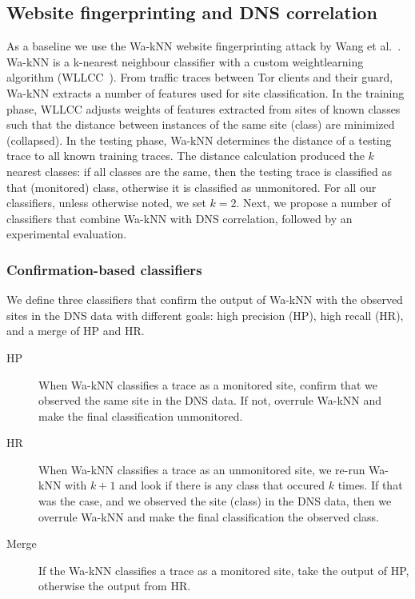 \subsection{Website fingerprinting and DNS correlation}
As a baseline we use the Wa-kNN website fingerprinting attack by
Wang et al.~\cite{Wang2014a}. Wa-kNN is a k-nearest neighbour classifier with
a custom weightlearning algorithm (WLLCC~\cite{WangThesis}). From traffic traces
between Tor clients and their guard, Wa-kNN extracts a number of features used
for site classification.
In the training phase, WLLCC adjusts weights of features extracted from sites
of known classes such that the distance between instances of the same site (class) are minimized (collapsed).
In the testing phase, Wa-kNN determines the distance of a testing trace to all
known training traces. The distance calculation produced the $k$ nearest
classes: if all classes are the same, then the testing trace is classified as
that (monitored) class, otherwise it is classified as unmonitored.
For all our classifiers, unless otherwise noted, we set $k=2$. Next, we propose
a number of classifiers that combine Wa-kNN with DNS correlation, followed by
an experimental evaluation.

\subsubsection{Confirmation-based classifiers}
We define three classifiers that confirm the output of Wa-kNN with the observed
sites in the DNS data with different goals: high precision (HP), high
 recall (HR), and a merge of HP and HR.

 \begin{description}
 	\item[HP] When Wa-kNN classifies a trace as a monitored site, confirm
	that we observed the same site in the DNS data. If not, overrule Wa-kNN and
	make the final classification unmonitored.
	\item[HR] When Wa-kNN classifies a trace as an unmonitored site, we re-run
	Wa-kNN with $k+1$ and look if there is any class that occured $k$ times.
	If that was the case, and we observed the site (class) in the DNS data,
	then we overrule Wa-kNN and make the final classification the observed class.
	\item[Merge] If the Wa-kNN classifies a trace as a monitored site, take the
	output of HP, otherwise the output from HR.
 \end{description}

